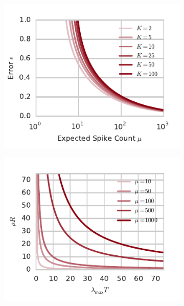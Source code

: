 \begin{figure}[t!]
  \centering
  \begin{subfigure}[b]{2.75in}
   \centering
   \caption{}
   \vspace{-.4in}
   \includegraphics[width=\textwidth]{figures/ch7/error_vs_expected_spike_count}
   \label{fig:error_vs_expected_spike_count}
 \end{subfigure}
 \begin{subfigure}[b]{2.75in}
   \centering
   \caption{}
   \vspace{-.4in}
   \includegraphics[width=\textwidth]{figures/ch7/mu_for_R_T}

\end{subfigure}
\end{figure}
